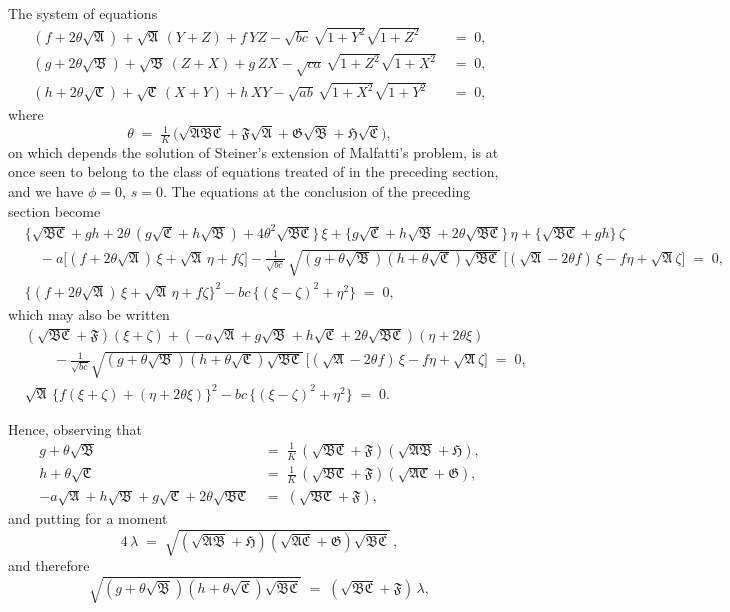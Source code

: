 \documentclass[11pt]{article}
\providecommand{\fA}{\mathfrak{A}}
\providecommand{\fB}{\mathfrak{B}}
\providecommand{\fC}{\mathfrak{C}}
\providecommand{\fF}{\mathfrak{F}}
\providecommand{\fG}{\mathfrak{G}}
\providecommand{\fH}{\mathfrak{H}}
\begin{document}
The system of equations
\begin{align*}
(f + 2\theta\sqrt{\fA}) + \sqrt{\fA}\,(Y + Z) + f\,YZ - \sqrt{bc}\,\sqrt{1 + Y^{2}}\sqrt{1 + Z^{2}} &\;=\; 0,\\
(g + 2\theta\sqrt{\fB}) + \sqrt{\fB}\,(Z + X) + g\,ZX - \sqrt{ca}\,\sqrt{1 + Z^{2}}\sqrt{1 + X^{2}} &\;=\; 0,\\
(h + 2\theta\sqrt{\fC}) + \sqrt{\fC}\,(X + Y) + h\,XY - \sqrt{ab}\,\sqrt{1 + X^{2}}\sqrt{1 + Y^{2}} &\;=\; 0,
\end{align*}
where
\[
\theta \;=\; \tfrac{1}{K}\,\bigl(\sqrt{\fA\fB\fC} + \fF\sqrt{\fA} + \fG\sqrt{\fB} + \fH\sqrt{\fC}\bigr),
\]
on which depends the solution of Steiner's extension of Malfatti's problem, is at once seen to belong to the class of equations treated of in the preceding section, and we have $\phi = 0$, $s = 0$. The equations at the conclusion of the preceding section become
\begin{align*}
&\bigl\{\sqrt{\fB\fC} + gh + 2\theta\,(g\sqrt{\fC} + h\sqrt{\fB}) + 4\theta^{2}\sqrt{\fB\fC}\bigr\}\,\xi + \bigl\{g\sqrt{\fC} + h\sqrt{\fB} + 2\theta\sqrt{\fB\fC}\bigr\}\,\eta + \bigl\{\sqrt{\fB\fC} + gh\bigr\}\,\zeta\\
&\quad - a\bigl[(f + 2\theta\sqrt{\fA})\,\xi + \sqrt{\fA}\,\eta + f\zeta\bigr] - \tfrac{1}{\sqrt{bc}}\,\sqrt{(g + \theta\sqrt{\fB})(h + \theta\sqrt{\fC})\sqrt{\fB\fC}}\,\bigl[(\sqrt{\fA} - 2\theta f)\,\xi - f\eta + \sqrt{\fA}\zeta\bigr] \;=\; 0,\\
&\bigl\{(f + 2\theta\sqrt{\fA})\,\xi + \sqrt{\fA}\,\eta + f\zeta\bigr\}^{2} - bc\,\bigl\{(\xi - \zeta)^{2} + \eta^{2}\bigr\} \;=\; 0,
\end{align*}
which may also be written
\begin{align*}
&(\sqrt{\fB\fC} + \fF)(\xi + \zeta) + (-a\sqrt{\fA} + g\sqrt{\fB} + h\sqrt{\fC} + 2\theta\sqrt{\fB\fC})(\eta + 2\theta\xi)\\
&\qquad - \tfrac{1}{\sqrt{bc}}\sqrt{(g + \theta\sqrt{\fB})(h + \theta\sqrt{\fC})\sqrt{\fB\fC}}\,\bigl[(\sqrt{\fA} - 2\theta f)\,\xi - f\eta + \sqrt{\fA}\zeta\bigr] \;=\; 0,\\
&\sqrt{\fA}\,\bigl\{f(\xi + \zeta) + (\eta + 2\theta\xi)\bigr\}^{2} - bc\,\bigl\{(\xi - \zeta)^{2} + \eta^{2}\bigr\} \;=\; 0.
\end{align*}

Hence, observing that
\begin{align*}
g + \theta\sqrt{\fB} &\;=\; \tfrac{1}{K}\,(\sqrt{\fB\fC} + \fF)(\sqrt{\fA\fB} + \fH),\\
h + \theta\sqrt{\fC} &\;=\; \tfrac{1}{K}\,(\sqrt{\fB\fC} + \fF)(\sqrt{\fA\fC} + \fG),\\
-a\sqrt{\fA} + h\sqrt{\fB} + g\sqrt{\fC} + 2\theta\sqrt{\fB\fC} &\;=\; (\sqrt{\fB\fC} + \fF),
\end{align*}
and putting for a moment
\[
4\,\lambda \;=\; \sqrt{(\sqrt{\fA\fB} + \fH)(\sqrt{\fA\fC} + \fG)\sqrt{\fB\fC}}\,,
\]
and therefore
\[
\sqrt{(g + \theta\sqrt{\fB})(h + \theta\sqrt{\fC})\sqrt{\fB\fC}} \;=\; (\sqrt{\fB\fC} + \fF)\,\lambda,
\]
\end{document}
